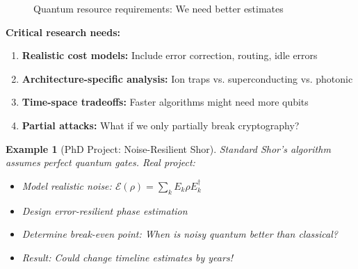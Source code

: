 \documentclass[11pt,a4paper]{article}
\newtheorem{example}{Example}
\begin{document}
\begin{figure}[h]
\centering
{}
\caption{Quantum resource requirements: We need better estimates}
\end{figure}

\textbf{Critical research needs:}
\begin{enumerate}
    \item \textbf{Realistic cost models:} Include error correction, routing, idle errors
    \item \textbf{Architecture-specific analysis:} Ion traps vs. superconducting vs. photonic
    \item \textbf{Time-space tradeoffs:} Faster algorithms might need more qubits
    \item \textbf{Partial attacks:} What if we only partially break cryptography?
\end{enumerate}

\begin{example}[PhD Project: Noise-Resilient Shor]
Standard Shor's algorithm assumes perfect quantum gates. Real project:
\begin{itemize}
    \item Model realistic noise: $\mathcal{E}(\rho) = \sum_k E_k \rho E_k^\dagger$
    \item Design error-resilient phase estimation
    \item Determine break-even point: When is noisy quantum better than classical?
    \item Result: Could change timeline estimates by years!
\end{itemize}
\end{example}
\end{document}
